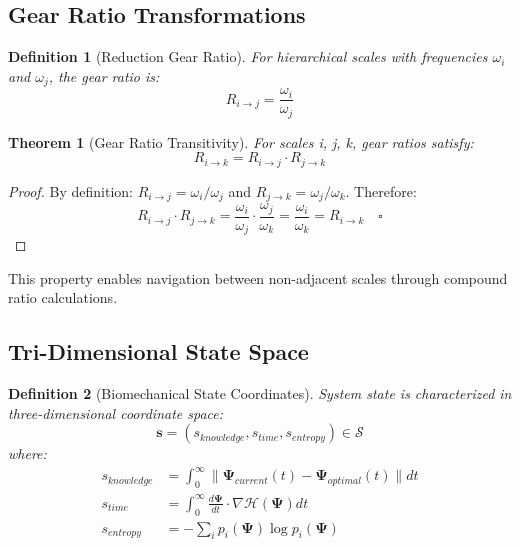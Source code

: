\documentclass[12pt,twocolumn]{article}
\newtheorem{theorem}{Theorem}
\newtheorem{definition}{Definition}
\begin{document}
\subsection{Gear Ratio Transformations}

\begin{definition}[Reduction Gear Ratio]
For hierarchical scales with frequencies $\omega_i$ and $\omega_j$, the gear ratio is:
\begin{equation}
R_{i \to j} = \frac{\omega_i}{\omega_j}
\end{equation}
\end{definition}

\begin{theorem}[Gear Ratio Transitivity]
For scales i, j, k, gear ratios satisfy:
\begin{equation}
R_{i \to k} = R_{i \to j} \cdot R_{j \to k}
\end{equation}
\end{theorem}

\begin{proof}
By definition: $R_{i \to j} = \omega_i/\omega_j$ and $R_{j \to k} = \omega_j/\omega_k$. Therefore:
\begin{equation}
R_{i \to j} \cdot R_{j \to k} = \frac{\omega_i}{\omega_j} \cdot \frac{\omega_j}{\omega_k} = \frac{\omega_i}{\omega_k} = R_{i \to k} \quad \square
\end{equation}
\end{proof}

This property enables navigation between non-adjacent scales through compound ratio calculations.

\subsection{Tri-Dimensional State Space}

\begin{definition}[Biomechanical State Coordinates]
System state is characterized in three-dimensional coordinate space:
\begin{equation}
\mathbf{s} = (s_{knowledge}, s_{time}, s_{entropy}) \in \mathcal{S}
\end{equation}
where:
\begin{align}
s_{knowledge} &= \int_0^{\infty} \|\mathbf{\Psi}_{current}(t) - \mathbf{\Psi}_{optimal}(t)\| dt \nonumber \\
s_{time} &= \int_0^{\infty} \frac{d\mathbf{\Psi}}{dt} \cdot \nabla \mathcal{H}(\mathbf{\Psi}) dt \nonumber \\
s_{entropy} &= -\sum_i p_i(\mathbf{\Psi}) \log p_i(\mathbf{\Psi})
\end{align}
\end{definition}
\end{document}
